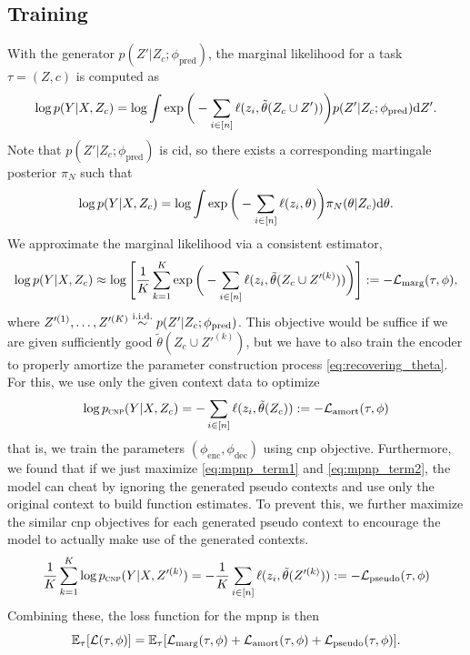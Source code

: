 \subsection{Training}\label{main:subsec:training}

With the generator $p(Z'|Z_c;\phi_\text{pred})$, the marginal likelihood for a task $\tau = (Z, c)$ is computed as
\[\label{eq:logmarginal_mp}
\log p(Y|X, Z_c) = \log\int \exp\bigg(-\sum_{i\in [n]}\ell(z_i, \tilde\theta(Z_c\cup Z'))\bigg) p(Z'|Z_c;\phi_\text{pred}) \mathrm{d} Z'.
\]
Note that $p(Z'|Z_c;\phi_{\text{pred}})$ is \gls{cid}, so there exists a corresponding martingale posterior $\pi_N$ such that
\[
\log p(Y|X, Z_c) = \log\int \exp\bigg(-\sum_{i\in [n]}\ell(z_i, \theta)\bigg) \pi_N(\theta|Z_c) \mathrm{d} \theta.
\]
We approximate the marginal likelihood via a consistent estimator,
\[\label{eq:mpnp_term1}
\log p(Y|X, Z_c) \approx \log \Bigg[ \frac{1}{K} \sum_{k=1}^K \exp\bigg(-\sum_{i\in [n]}\ell(z_i, \tilde\theta(Z_c\cup Z'^{(k)}))\bigg)
\Bigg] := -{\mathcal{L}}_\text{marg}(\tau,\phi),
\]
where $Z'^{(1)},\dots, Z'^{(K)}\overset{\mathrm{i.i.d.}}{\sim} p(Z'|Z_c;\phi_\text{pred})$. This objective would be suffice if we are given sufficiently good $\tilde\theta(Z_c \cup Z'^{(k)})$, but we have to also train the encoder to properly amortize the parameter construction process \cref{eq:recovering_theta}. For this, we use only the given context data to optimize
\[\label{eq:mpnp_term2}
\log p_{\textsc{cnp}}(Y|X, Z_c) = -\sum_{i\in [n]} \ell(z_i, \tilde\theta(Z_c)) := -{\mathcal{L}}_\text{amort}(\tau,\phi)
\]
that is, we train the parameters $(\phi_\text{enc}, \phi_\text{dec})$ using \gls{cnp} objective. Furthermore, we found that if we just maximize \cref{eq:mpnp_term1} and \cref{eq:mpnp_term2}, the model can cheat by ignoring the generated pseudo contexts and use only the original context to build function estimates. To prevent this, we further maximize the similar \gls{cnp} objectives for each generated pseudo context to encourage the model to actually make use of the generated contexts.
\[\label{eq:mpnp_term3}
\frac{1}{K}\sum_{k=1}^K \log p_{\textsc{cnp}} (Y|X, Z'^{(k)}) = -\frac{1}{K}\sum_{i\in [n]} \ell(z_i, \tilde\theta(Z'^{(k)})) := -{\mathcal{L}}_\text{pseudo}(\tau,\phi)
\]
Combining these, the loss function for the \gls{mpnp} is then
\[\label{eq:mpnp_term_whole}
\mathbb{E}_{\tau}[{\mathcal{L}}(\tau,\phi)] = \mathbb{E}_\tau[{\mathcal{L}}_\text{marg}(\tau,\phi) + {\mathcal{L}}_\text{amort}(\tau,\phi) + {\mathcal{L}}_\text{pseudo}(\tau,\phi)].
\]

